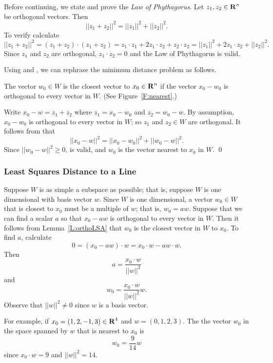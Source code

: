 Before continuing, we state and prove the {\em Law of Phythagorus\/}.
  Let $z_1,z_2\in\mbox{$\bf{R}$}^n$ be orthogonal vectors.  Then 
\begin{equation} \label{E:LP}
||z_1+z_2||^2 = ||z_1||^2 + ||z_2||^2.
\end{equation}
To verify  calculate 
\[
||z_1+z_2||^2=(z_1+z_2)\cdot(z_1+z_2)=z_1\cdot z_1 +2z_1\cdot z_2+z_2\cdot z_2
=||z_1||^2 + 2z_1\cdot z_2 +||z_2||^2.
\]
Since $z_1$ and $z_2$ are orthogonal, $z_1\cdot z_2=0$ and the Law of 
Phythagorus is valid.

Using  and , we can rephrase the minimum distance 
problem as follows.
\begin{lemma}  \label{L:orthoLSA}
The vector $w_0\in W$ is the closest vector to $x_0\in\mbox{$\bf{R}$}^n$ if the vector 
$x_0-w_0$ is orthogonal to every vector in $W$. (See Figure~\ref{F:nearest}.)
\end{lemma}

\proof  Write $x_0-w=z_1+z_2$ where $z_1=x_0-w_0$ and $z_2=w_0-w$.  By 
assumption, $x_0-w_0$ is orthogonal to every vector in $W$; so $z_1$ and 
$z_2\in W$ are orthogonal.  It follows from  that
\[
||x_0-w||^2 = ||x_0-w_0||^2 + ||w_0-w||^2.
\]
Since $||w_0-w||^2\ge 0$,  is valid, and $w_0$ is the vector 
nearest to $x_0$ in $W$. \qed

\subsubsection*{Least Squares Distance to a Line}

Suppose $W$ is as simple a subspace as possible; that is, suppose $W$ is one
dimensional with basis vector $w$.  Since $W$ is one dimensional, a vector
$w_0\in W$ that is closest to $x_0$ must be a multiple of $w$; that is,
$w_0=aw$.  Suppose that we can find a scalar $a$ so that $x_0-aw$ is
orthogonal to every vector in $W$.  Then it follows from
Lemma~\ref{L:orthoLSA} that $w_0$ is the closest vector in $W$ to $x_0$.
To find $a$, calculate
\[
0 = (x_0-aw)\cdot w = x_0\cdot w - a w\cdot w.
\]
Then
\[
a = \frac{x_0\cdot w}{||w||^2}
\]
and
\begin{equation}  \label{E:singleortho}
w_0 = \frac{x_0\cdot w}{||w||^2} w.
\end{equation}
Observe that $||w||^2\not=0$ since $w$ is a basis vector.

For example, if $x_0=(1,2,-1,3)\in\mbox{$\bf{R}$}^4$ and $w=(0,1,2,3)$.  The the vector
$w_0$ in the space spanned by $w$ that is nearest to $x_0$ is
\[
w_0 = \frac{9}{14}w
\]
since $x_0\cdot w=9$ and $||w||^2=14$.

